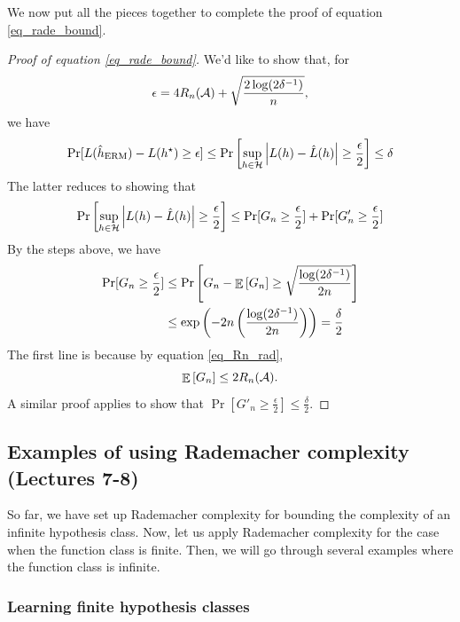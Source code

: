 We now put all the pieces together to complete the proof of equation \eqref{eq_rade_bound}.
\begin{proof}[Proof of equation \eqref{eq_rade_bound}] 
    We’d like to show that, for \[ \epsilon = 4R_n(\mathcal{A}) + \sqrt{\frac {2\log(2\delta^{-1})} n}, \]
    we have
        \[ \Pr[L(\hat h_{\textup{ERM}}) - L(h^{\star}) \ge \epsilon ] \le \Pr\left[ \sup_{h\in\mathcal{H}} {\left| {L(h) - \hat L(h)} \right|} \ge \frac {\epsilon} 2\right] \le \delta \] 
    The latter reduces to showing that
        \[ \Pr\left[\sup_{h \in \mathcal{H}} {\left| {L(h) - \hat L(h)} \right|} \ge \frac {\epsilon} 2\right] \le \Pr[G_n \ge \frac {\epsilon} 2 ] + \Pr[G'_n \ge \frac {\epsilon} 2]  \]
    By the steps above, we have
        \begin{align*}
            \Pr[G_n \ge \frac{\epsilon} 2 ] &\le \Pr\left[G_n - \mathop{\mathbb{E}}\left[ G_n \right] \ge \sqrt{\frac {\log(2\delta^{-1})} {2n}}\right]\\
            &\le \exp\left( -2n \left(\frac {\log(2\delta^{-1})} {2n}\right)\right) = \frac {\delta} 2
        \end{align*}
    The first line is because by equation \eqref{eq_Rn_rad}, \[ \mathop{\mathbb{E}}\left[ G_n \right] \le 2 R_n(\mathcal{A}). \]
    A similar proof applies to show that $\Pr[G'_n \ge \frac {\epsilon} 2] \le \frac {\delta} 2$.
\end{proof}

\subsection{Examples of using Rademacher complexity (Lectures 7-8)}

So far, we have set up Rademacher complexity for bounding the complexity of an infinite hypothesis class.
Now, let us apply Rademacher complexity for the case when the function class is finite.
Then, we will go through several examples where the function class is infinite.

\subsubsection{Learning finite hypothesis classes}

